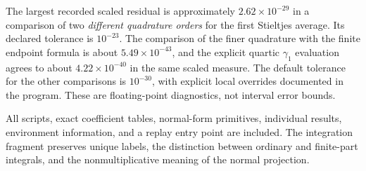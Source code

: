 The largest recorded scaled residual is approximately
$2.62\times10^{-29}$ in a comparison of two \emph{different quadrature
orders} for the first Stieltjes average. Its declared tolerance is
$10^{-23}$. The comparison of the finer quadrature with the finite
endpoint formula is about $5.49\times10^{-43}$, and the explicit
quartic $\gamma_1$ evaluation agrees to about $4.22\times10^{-40}$
in the same scaled measure. The default tolerance for the other
comparisons is $10^{-30}$, with explicit local overrides documented
in the program. These are floating-point diagnostics, not interval
error bounds.

All scripts, exact coefficient tables, normal-form primitives,
individual results, environment information, and a replay entry point
are included. The integration fragment preserves unique 
labels, the distinction between ordinary and finite-part integrals,
and the nonmultiplicative meaning of the normal projection.
